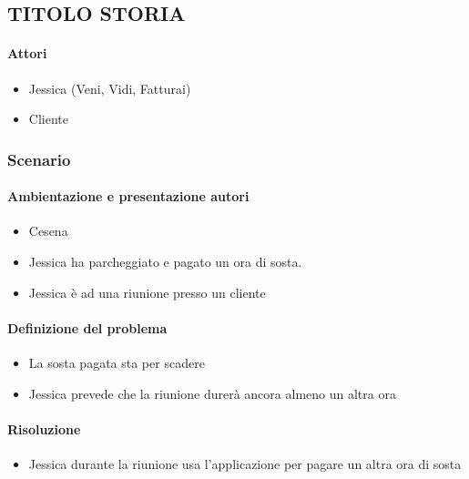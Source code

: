 \documentclass[../../UUX_Personas.tex]{subfiles}
\begin{document}
	\subsection{TITOLO STORIA}
	\paragraph{Attori}
	\begin{itemize}
		\item Jessica (Veni, Vidi, Fatturai)
		\item Cliente %
	\end{itemize}

	\subsubsection{Scenario} 
	\paragraph{Ambientazione e presentazione autori}
	\begin{itemize}
		\item Cesena
		\item Jessica ha parcheggiato e pagato un ora di sosta.
		\item Jessica è ad una riunione presso un cliente
	\end{itemize}
	\paragraph{Definizione del problema}
	\begin{itemize}
		\item La sosta pagata sta per scadere
		\item Jessica prevede che la riunione durerà ancora almeno un altra ora
	\end{itemize}
	\paragraph{Risoluzione}
	\begin{itemize}
		\item Jessica durante la riunione usa l'applicazione per pagare un altra ora di sosta
	\end{itemize}
\end{document}
